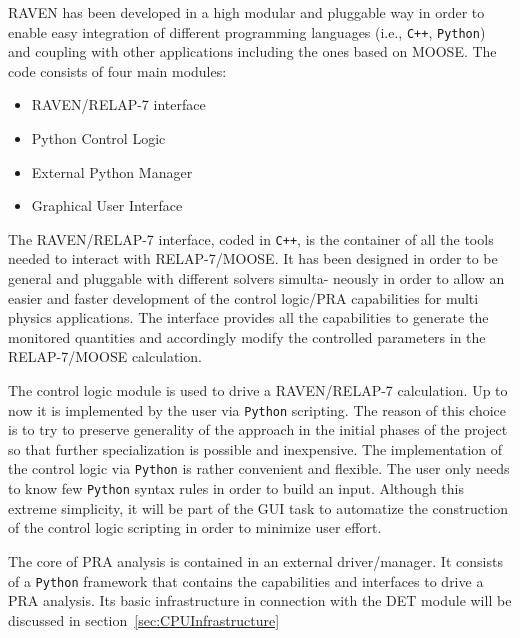 \documentclass{mc2013}
\begin{document}
RAVEN has been developed in a high modular and pluggable way in order to enable easy integration of different programming languages (i.e., \verb!C++!, \verb!Python!) and coupling with other applications including the ones based on MOOSE. The code consists of four main modules:
\vspace{-5mm}
\begin{itemize}
\itemsep0em
\item RAVEN/RELAP-7 interface
\item Python Control Logic 
\item External Python Manager
\item Graphical User Interface 
\end{itemize}
\vspace{-5mm}
The RAVEN/RELAP-7 interface, coded in \verb!C++!, is the container of all the tools needed to interact with RELAP-7/MOOSE. It has been designed in order to be general and pluggable with different solvers simulta- neously in order to allow an easier and faster development of the control logic/PRA capabilities for multi physics applications.
The interface provides all the capabilities to generate the monitored quantities and accordingly modify the controlled parameters in the RELAP-7/MOOSE calculation.

The control logic module is used to drive a RAVEN/RELAP-7 calculation. Up to now it is implemented by the user via \verb!Python! scripting. The reason of this choice is to try to preserve generality of the approach in the initial phases of the project so that further specialization is possible and  inexpensive. The implementation of the control logic via \verb!Python! is rather convenient and flexible. The user only needs to know few \verb!Python! syntax rules in order to build an input. Although this extreme simplicity, it will be part of the GUI task to automatize the construction of the control logic scripting in order to minimize user effort. 

The core of PRA analysis is contained in an external driver/manager. It consists of a \verb!Python! framework that contains the capabilities and interfaces to drive a PRA analysis. Its basic infrastructure in connection with the DET module will be discussed in section~\ref{sec:CPUInfrastructure}   
\end{document}
